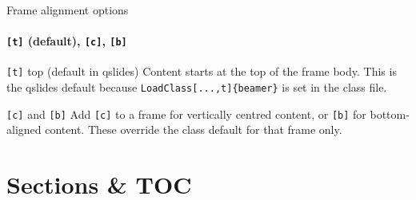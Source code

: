 \documentclass[sans,numeric,titlesplit]{qslides}
\begin{document}
\begin{frame}{Frame alignment options}
  \framesubtitle{\texttt{[t]} (default), \texttt{[c]}, \texttt{[b]}}
  \begin{twocolumns}[t]
    \begin{leftcolumn}
      \begin{block}{\texttt{[t]} top (default in qslides)}
        Content starts at the top of the frame body.
        This is the qslides default because \texttt{LoadClass[...,t]\{beamer\}}
        is set in the class file.
      \end{block}
    \end{leftcolumn}
    \begin{rightcolumn}
      \begin{block}{\texttt{[c]} and \texttt{[b]}}
        Add \texttt{[c]} to a frame for vertically centred content, or
        \texttt{[b]} for bottom-aligned content.  These override the class
        default for that frame only.
      \end{block}
    \end{rightcolumn}
  \end{twocolumns}
\end{frame}


\section{Sections \& TOC}
\end{document}
